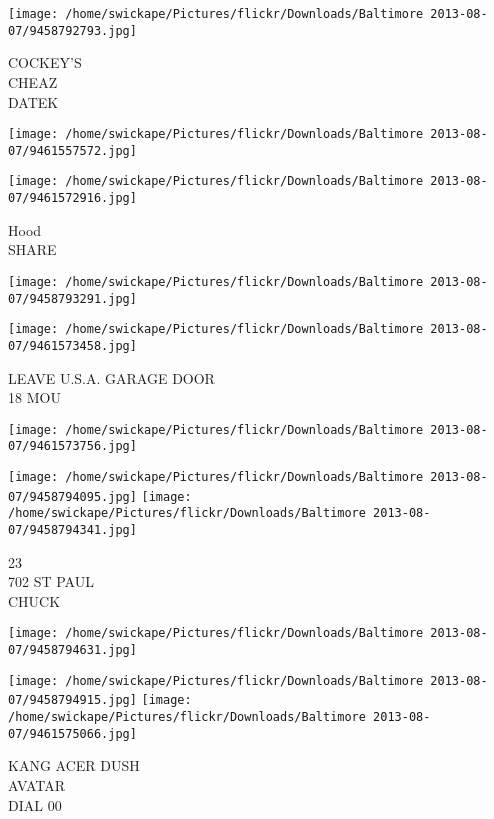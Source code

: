 \documentclass[10pt,letterpaper]{article}
\begin{document}
\vspace{0.25in}
\texttt{[image: /home/swickape/Pictures/flickr/Downloads/Baltimore 2013-08-07/9458792793.jpg]}

COCKEY'S\\
CHEAZ\\
DATEK\\
\pagebreak

\texttt{[image: /home/swickape/Pictures/flickr/Downloads/Baltimore 2013-08-07/9461557572.jpg]}

\vspace{0.25in}
\texttt{[image: /home/swickape/Pictures/flickr/Downloads/Baltimore 2013-08-07/9461572916.jpg]}

Hood\\
SHARE\\
\pagebreak

\texttt{[image: /home/swickape/Pictures/flickr/Downloads/Baltimore 2013-08-07/9458793291.jpg]}

\vspace{0.25in}
\texttt{[image: /home/swickape/Pictures/flickr/Downloads/Baltimore 2013-08-07/9461573458.jpg]}

LEAVE U.S.A. GARAGE DOOR\\
18 MOU\\
\pagebreak

\texttt{[image: /home/swickape/Pictures/flickr/Downloads/Baltimore 2013-08-07/9461573756.jpg]}

\vspace{0.25in}
\texttt{[image: /home/swickape/Pictures/flickr/Downloads/Baltimore 2013-08-07/9458794095.jpg]}
\texttt{[image: /home/swickape/Pictures/flickr/Downloads/Baltimore 2013-08-07/9458794341.jpg]}

23\\
702 ST PAUL\\
CHUCK\\
\pagebreak

\texttt{[image: /home/swickape/Pictures/flickr/Downloads/Baltimore 2013-08-07/9458794631.jpg]}

\vspace{0.25in}
\texttt{[image: /home/swickape/Pictures/flickr/Downloads/Baltimore 2013-08-07/9458794915.jpg]}
\texttt{[image: /home/swickape/Pictures/flickr/Downloads/Baltimore 2013-08-07/9461575066.jpg]}

KANG ACER DUSH\\
AVATAR\\
DIAL 00\\
\pagebreak
\end{document}
